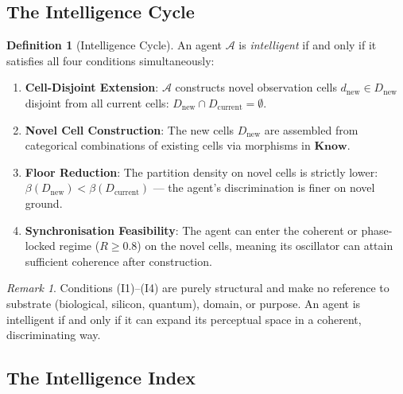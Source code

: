 \documentclass[twocolumn,11pt,a4paper]{article}
\theoremstyle{plain}
\theoremstyle{definition}
\newtheorem{definition}[theorem]{Definition}
\theoremstyle{remark}
\newtheorem{remark}[theorem]{Remark}
\begin{document}
\subsection{The Intelligence Cycle}

\begin{definition}[Intelligence Cycle]
\label{def:cycle}
An agent $\mathcal{A}$ is \emph{intelligent} if and only if it satisfies all four conditions simultaneously:
\begin{enumerate}[label=(I\arabic*)]
  \item \textbf{Cell-Disjoint Extension}: $\mathcal{A}$ constructs novel observation cells $d_{\mathrm{new}} \in D_{\mathrm{new}}$ disjoint from all current cells: $D_{\mathrm{new}} \cap D_{\mathrm{current}} = \emptyset$.
  \item \textbf{Novel Cell Construction}: The new cells $D_{\mathrm{new}}$ are assembled from categorical combinations of existing cells via morphisms in $\mathbf{Know}$.
  \item \textbf{Floor Reduction}: The partition density on novel cells is strictly lower: $\beta(D_{\mathrm{new}}) < \beta(D_{\mathrm{current}})$ — the agent's discrimination is finer on novel ground.
  \item \textbf{Synchronisation Feasibility}: The agent can enter the coherent or phase-locked regime ($R \ge 0.8$) on the novel cells, meaning its oscillator can attain sufficient coherence after construction.
\end{enumerate}
\end{definition}

\begin{remark}
Conditions (I1)--(I4) are purely structural and make no reference to substrate (biological, silicon, quantum), domain, or purpose.  An agent is intelligent if and only if it can expand its perceptual space in a coherent, discriminating way.
\end{remark}

\subsection{The Intelligence Index}
\end{document}
